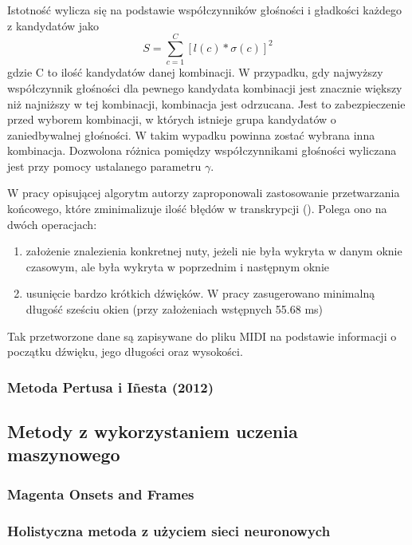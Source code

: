 \documentclass[12pt,a4paper,twoside]{mwart}
\begin{document}
Istotność wylicza się na podstawie współczynników głośności i gładkości każdego z kandydatów jako
\begin{equation}\label{eq:inharmonicity:salience}
  S = \sum_{c=1}^C\left[l(c)*\sigma(c)\right]^2
\end{equation}
gdzie C to ilość kandydatów danej kombinacji. W przypadku, gdy najwyższy współczynnik głośności dla pewnego kandydata kombinacji jest znacznie większy niż najniższy w tej kombinacji, kombinacja jest odrzucana. Jest to zabezpieczenie przed wyborem kombinacji, w których istnieje grupa kandydatów o zaniedbywalnej głośności. W takim wypadku powinna zostać wybrana inna kombinacja. Dozwolona różnica pomiędzy współczynnikami głośności wyliczana jest przy pomocy ustalanego parametru $\gamma$.

W pracy opisującej algorytm autorzy zaproponowali zastosowanie przetwarzania końcowego, które zminimalizuje ilość błędów w transkrypcji (\cite[106-107]{Transcription:Pertus:Inharmonicity}). Polega ono na dwóch operacjach:
\begin{enumerate}
  \item założenie znalezienia konkretnej nuty, jeżeli nie była wykryta w danym oknie czasowym, ale była wykryta w poprzednim i następnym oknie
  \item usunięcie bardzo krótkich dźwięków. W pracy zasugerowano minimalną długość sześciu okien (przy założeniach wstępnych 55.68 ms)
\end{enumerate}
Tak przetworzone dane są zapisywane do pliku MIDI na podstawie informacji o początku dźwięku, jego długości oraz wysokości.

\subsubsection{Metoda Pertusa i Iñesta (2012)}
\cite{Transcription:Pertus:Inharmonicity2}

\subsection{Metody z wykorzystaniem uczenia maszynowego}
\subsubsection{Magenta Onsets and Frames}
\cite{performance-rnn-2017}
\subsubsection{Holistyczna metoda z użyciem sieci neuronowych}
\cite{Transcription:Pertus:NeuralNetwork}
\end{document}
